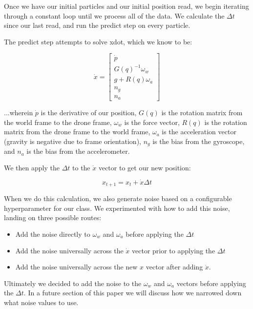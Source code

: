 \documentclass{article}
\begin{document}
Once we have our initial particles and our initial position read, we begin iterating through a constant loop until we process all of the data. We calculate the $\Delta t$ since our last read, and run the predict step on every particle.

The predict step attempts to solve xdot, which we know to be:

\begin{equation}
    \dot{x} = \begin{bmatrix}
        \dot{p}            \\
        G(q)^{-1} \omega_w \\
        g + R(q) \omega_a  \\
        n_g                \\
        n_a
    \end{bmatrix}
\end{equation}

...wherein $\dot{p}$ is the derivative of our position, $G(q)$ is the rotation matrix from the world frame to the drone frame, $\omega_w$ is the force vector, $R(q)$ is the rotation matrix from the drone frame to the world frame, $\omega_a$ is the acceleration vector (gravity is negative due to frame orientation), $n_g$ is the bias from the gyroscope, and $n_a$ is the bias from the accelerometer.

We then apply the $\Delta t$ to the $\dot{x}$ vector to get our new position:

\begin{equation}
    x_{t+1} = x_t + \dot{x} \Delta t
\end{equation}

When we do this calculation, we also generate noise based on a configurable hyperparameter for our class. We experimented with how to add this noise, landing on three possible routes:

\begin{itemize}
    \item Add the noise directly to $\omega_w$ and $\omega_a$ before applying the $\Delta t$
    \item Add the noise universally across the $\dot{x}$ vector prior to applying the $\Delta t$
    \item Add the noise universally across the new $x$ vector after adding $\dot{x}$.
\end{itemize}

Ultimately we decided to add the noise to the $\omega_w$ and $\omega_a$ vectors before applying the $\Delta t$. In a future section of this paper we will discuss how we narrowed down what noise values to use.
\end{document}
